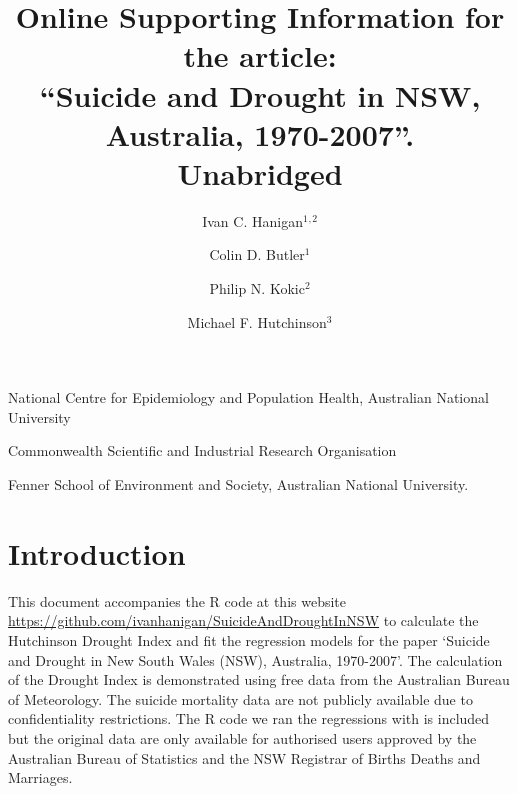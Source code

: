 \documentclass[a4paper]{article}                %
\begin{document}

\title{Online Supporting Information for the article:\\ ``Suicide and Drought in NSW, Australia, 1970-2007''.\\ Unabridged}
\author{Ivan C. Hanigan$^1$$^,$$^2$ \and Colin D. Butler$^1$ \and
  Philip N. Kokic$^2$ \and
  Michael F. Hutchinson$^3$}
\date{}
\maketitle


\noindent [$^1$]National Centre for Epidemiology and Population Health, Australian National University


\noindent [$^2$]Commonwealth Scientific and Industrial Research Organisation

\noindent [$^3$]Fenner School of Environment and Society, Australian National University.



\setcounter{page}{1}
\tableofcontents
{}
\setcounter{page}{1}

\doublespacing   %




\section{Introduction}

        This document accompanies the R code at this website \url{https://github.com/ivanhanigan/SuicideAndDroughtInNSW} to calculate the Hutchinson Drought Index and fit the regression models for the paper `Suicide and Drought in New South Wales (NSW), Australia, 1970-2007'.  The calculation of the Drought Index is demonstrated using free data from the Australian Bureau of Meteorology. The suicide mortality data are not publicly available due to confidentiality restrictions. The R code we ran the regressions with is included but the original data are only available for authorised users approved by the Australian Bureau of Statistics and the NSW Registrar of Births Deaths and Marriages.


\end{document}
